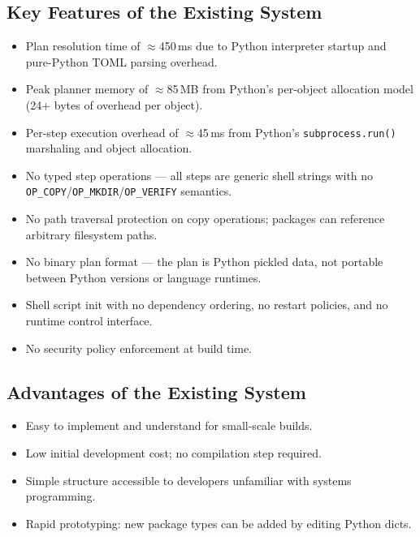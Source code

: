 \documentclass[12pt,a4paper]{report}
\begin{document}
\subsection{Key Features of the Existing System}
\begin{itemize}[leftmargin=2em, itemsep=2pt]
  \item Plan resolution time of $\approx$450\,ms due to Python interpreter startup
        and pure-Python TOML parsing overhead.
  \item Peak planner memory of $\approx$85\,MB from Python's per-object allocation
        model (24+ bytes of overhead per object).
  \item Per-step execution overhead of $\approx$45\,ms from Python's
        \texttt{subprocess.run()} marshaling and object allocation.
  \item No typed step operations --- all steps are generic shell strings with no
        \texttt{OP\_COPY}/\texttt{OP\_MKDIR}/\texttt{OP\_VERIFY} semantics.
  \item No path traversal protection on copy operations; packages can reference
        arbitrary filesystem paths.
  \item No binary plan format --- the plan is Python pickled data, not portable
        between Python versions or language runtimes.
  \item Shell script init with no dependency ordering, no restart policies, and no
        runtime control interface.
  \item No security policy enforcement at build time.
\end{itemize}

\subsection{Advantages of the Existing System}
\begin{itemize}[leftmargin=2em, itemsep=2pt]
  \item Easy to implement and understand for small-scale builds.
  \item Low initial development cost; no compilation step required.
  \item Simple structure accessible to developers unfamiliar with systems
        programming.
  \item Rapid prototyping: new package types can be added by editing Python dicts.
\end{itemize}
\end{document}
